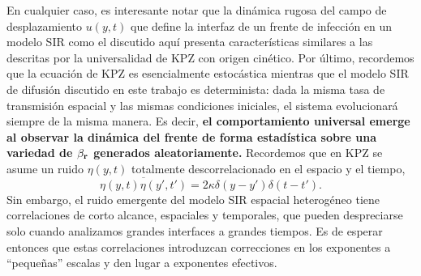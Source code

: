 En cualquier caso, es interesante notar que la dinámica rugosa del campo de desplazamiento $u(y,t)$ que define la interfaz de un frente de infección en un modelo SIR como el discutido aquí presenta características similares a las descritas por la universalidad de KPZ con origen cinético. Por último, recordemos que la ecuación de KPZ es esencialmente estocástica mientras que el modelo SIR de difusión discutido en este trabajo es determinista: dada la misma tasa de transmisión espacial y las mismas condiciones iniciales, el sistema evolucionará siempre de la misma manera. Es decir, \textbf{el comportamiento universal emerge al observar la dinámica del frente de forma estadística sobre una variedad de $\beta_{\vb{r}}$ generados aleatoriamente.} Recordemos que en KPZ se asume un ruido $\eta(y,t)$ totalmente descorrelacionado en el espacio y el tiempo,
\begin{equation}
    \overline{\eta(y,t)\eta(y',t')} = 2\kappa\delta(y-y')\delta(t-t').
\end{equation}
Sin embargo, el ruido emergente del modelo SIR espacial heterogéneo tiene correlaciones de corto alcance, espaciales y temporales, que pueden despreciarse solo cuando analizamos grandes interfaces a grandes tiempos. Es de esperar entonces que estas correlaciones introduzcan correcciones en los exponentes a ``pequeñas''  escalas y den lugar a exponentes efectivos. 